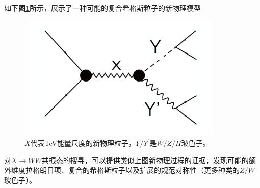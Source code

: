 如下\textbf{图\ref{fig:2.9}}所示，展示了一种可能的复合希格斯粒子的新物理模型\cite{Boosting_the_Higgs_boson}
\begin{figure}[H]
 \centering
 \includegraphics[height=6cm, width=10cm]{pictures/diboson_resonance_X.png}
  \caption{$X$代表TeV能量尺度的新物理粒子，$Y/Y^\prime$是$W/Z/H$玻色子。}
 \label{fig:2.9}
\end{figure}
对$X\to WW$共振态的搜寻，可以提供类似上图新物理过程的证据，发现可能的额外维度拉格朗日项、复合的希格斯粒子以及扩展的规范对称性（更多种类的$Z/W$玻色子）。
